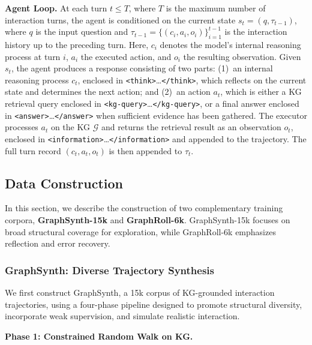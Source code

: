 \textbf{Agent Loop.}
At each turn $t \leq T$, where $T$ is the maximum number of 
interaction turns, the agent is conditioned on the current state 
$s_t = (q, \tau_{t-1})$, where $q$ is the input question and 
$\tau_{t-1} = \{(c_i, a_i, o_i)\}_{i=1}^{t-1}$ is the interaction 
history up to the preceding turn. Here, $c_i$ denotes the model's 
internal reasoning process at turn $i$, $a_i$ the executed action, 
and $o_i$ the resulting observation.
Given $s_t$, the agent produces a response consisting of two parts: 
(1)~an internal reasoning process $c_t$, enclosed in 
\texttt{<think>}\ldots\texttt{</think>}, which reflects on the current 
state and determines the next action; and (2)~an action $a_t$, which 
is either a KG retrieval query enclosed in 
\texttt{<kg-query>}\ldots\texttt{</kg-query>}, or a final answer 
enclosed in \texttt{<answer>}\ldots\texttt{</answer>} when sufficient 
evidence has been gathered.
The executor processes $a_t$ on the KG $\mathcal{G}$ and returns the 
retrieval result as an observation $o_t$, enclosed in 
\texttt{<information>}\ldots\texttt{</information>} and appended to 
the trajectory. The full turn record $(c_t, a_t, o_t)$ is then 
appended to $\tau_t$.




\subsection{Data Construction}
\label{sec:data_construction}

In this section, we describe the construction of two complementary training corpora, \textbf{GraphSynth-15k} and \textbf{GraphRoll-6k}.
GraphSynth-15k focuses on broad structural coverage for exploration, while GraphRoll-6k emphasizes reflection and error recovery.


\subsubsection{GraphSynth: Diverse Trajectory Synthesis}

We first construct GraphSynth, a 15k corpus of KG-grounded interaction trajectories, using a four-phase pipeline designed to promote structural diversity, incorporate weak supervision, and simulate realistic interaction.

\textbf{Phase 1: Constrained Random Walk on KG.}

